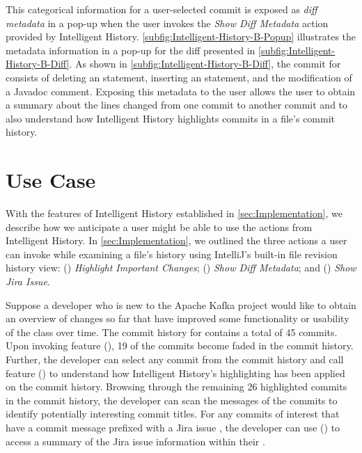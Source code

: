 This categorical information for a user-selected commit is exposed as \emph{diff metadata} in a pop-up when the user invokes the \textit{Show Diff Metadata} action provided by Intelligent History.
\autoref{subfig:Intelligent-History-B-Popup} illustrates the metadata information in a pop-up for the diff presented in \autoref{subfig:Intelligent-History-B-Diff}.
As shown in \autoref{subfig:Intelligent-History-B-Diff}, the commit  for  consists of deleting an  statement, inserting an  statement, and the modification of a Javadoc comment.
Exposing this metadata to the user allows the user to obtain a summary about the lines changed from one commit to another commit and to also understand how Intelligent History highlights commits in a file's commit history.

\section{Use Case}
\label{sec:Use-Case}

With the features of Intelligent History established in \autoref{sec:Implementation}, we describe how we anticipate a user might be able to use the actions from Intelligent History. 
In \autoref{sec:Implementation}, we outlined the three actions a user can invoke while examining a file's history using IntelliJ's built-in file revision history view: 
() \textit{Highlight Important Changes}; 
() \textit{Show Diff Metadata}; and 
() \textit{Show Jira Issue}.

Suppose a developer who is new to the Apache Kafka project would like to obtain an 
overview of changes so far that have improved some functionality or usability of 
the  class over time.
The commit history for  contains a total of 45 commits.
Upon invoking feature (), 19 of the commits become faded in the commit history.
Further, the developer can select any commit from the commit history and call feature () to understand how Intelligent History's highlighting has been applied on the  commit history.
Browsing through the remaining 26 highlighted commits in the  commit history, the developer can scan the messages of the commits to identify potentially interesting commit titles.
For any commits of interest that have a commit message prefixed with a Jira issue , the developer can use () to access a summary of the Jira issue information within their .

